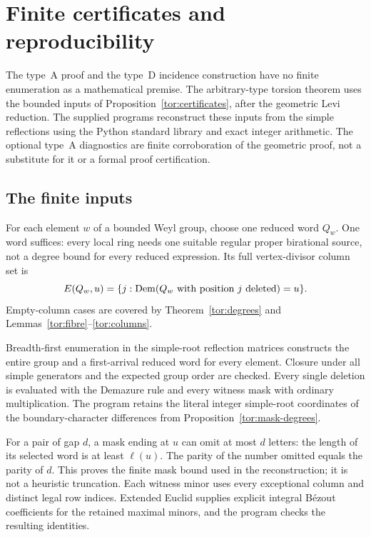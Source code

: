 \section{Finite certificates and reproducibility}\label{sec:reproducibility}

The type~A proof and the type~D incidence construction have no finite enumeration as a mathematical premise. The arbitrary-type torsion theorem uses the bounded inputs of Proposition~\ref{tor:certificates}, after the geometric Levi reduction. The supplied programs reconstruct these inputs from the simple reflections using the Python standard library and exact integer arithmetic. The optional type~A diagnostics are finite corroboration of the geometric proof, not a substitute for it or a formal proof certification.

\subsection{The finite inputs}
For each element $w$ of a bounded Weyl group, choose one reduced word $Q_w$. One word suffices: every local ring needs one suitable regular proper birational source, not a degree bound for every reduced expression. Its full vertex-divisor column set is
\[
 E(Q_w,u)=\{j:\operatorname{Dem}(Q_w\text{ with position }j\text{ deleted})=u\}.
\]
Empty-column cases are covered by Theorem~\ref{tor:degrees} and Lemmas~\ref{tor:fibre}--\ref{tor:columns}.

Breadth-first enumeration in the simple-root reflection matrices constructs the entire group and a first-arrival reduced word for every element. Closure under all simple generators and the expected group order are checked. Every single deletion is evaluated with the Demazure rule and every witness mask with ordinary multiplication. The program retains the literal integer simple-root coordinates of the boundary-character differences from Proposition~\ref{tor:mask-degrees}.

For a pair of gap $d$, a mask ending at $u$ can omit at most $d$ letters: the length of its selected word is at least $\ell(u)$. The parity of the number omitted equals the parity of $d$. This proves the finite mask bound used in the reconstruction; it is not a heuristic truncation. Each witness minor uses every exceptional column and distinct legal row indices. Extended Euclid supplies explicit integral B\'ezout coefficients for the retained maximal minors, and the program checks the resulting identities.

